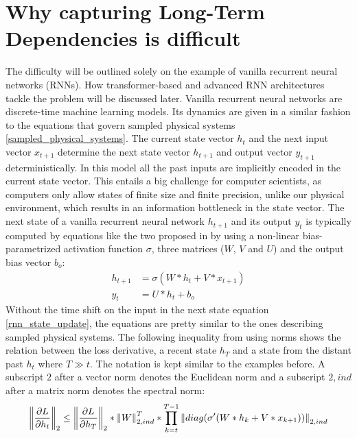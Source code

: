\documentclass[draft,final]{vutinfth} %
\begin{document}
    \section{Why capturing Long-Term Dependencies is difficult}
    The difficulty will be outlined solely on the example of vanilla recurrent neural networks (RNNs).
    How transformer-based and advanced RNN architectures tackle the problem will be discussed later.
    Vanilla recurrent neural networks are discrete-time machine learning models. 
    Its dynamics are given in a similar fashion to the equations that govern sampled physical systems \ref{sampled_physical_systems}.
    The current state vector $h_{t}$ and the next input vector $x_{t+1}$ determine the next state vector $h_{t+1}$ and output vector $y_{t+1}$ deterministically.
    In this model all the past inputs are implicitly encoded in the current state vector.
    This entails a big challenge for computer scientists, as computers only allow states of finite size and finite precision, unlike our physical environment, which results in an information bottleneck in the state vector.
    The next state of a vanilla recurrent neural network $h_{t+1}$ and its output $y_{t}$ is typically computed by equations like the two proposed in \cite[p. 2]{UnitaryRNNs} by using a non-linear bias-parametrized activation function $\sigma$, three matrices ($W$, $V$ and $U$) and the output bias vector $b_o$:
    \begin{align}
        \label{rnn_state_update}
        h_{t+1} &= \sigma(W*h_t + V*x_{t+1}) \\
        \label{rnn_output}
        y_{t} &= U*h_{t} + b_o
    \end{align}
    Without the time shift on the input in the next state equation \ref{rnn_state_update}, the equations are pretty similar to the ones describing sampled physical systems.
    The following inequality from \cite[p. 2]{UnitaryRNNs} using norms shows the relation between the loss derivative, a recent state $h_T$ and a state from the distant past $h_t$ where $T \gg t$.
    The notation is kept similar to the examples before. A subscript $2$ after a vector norm denotes the Euclidean norm and a subscript $2,ind$ after a matrix norm denotes the spectral norm:
    \begin{align}
        \label{gradient_formula}
        \left\Vert \pdv{L}{h_t} \right\Vert_2 \leq \left\Vert \pdv{L}{h_T} \right\Vert_2 * \left\Vert W \right\Vert_{2,ind}^T * \prod^{T-1}_{k=t} \left\Vert diag(\sigma'(W*h_k + V*x_{k+1})) \right\Vert_{2,ind}
    \end{align}
\end{document}
